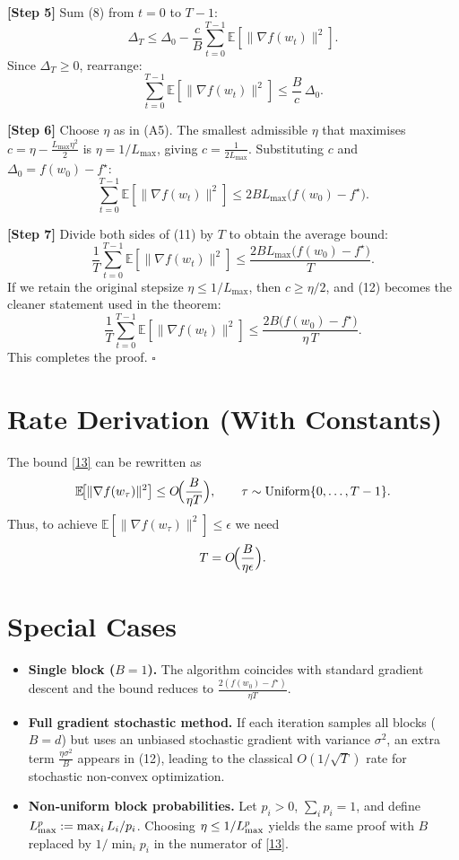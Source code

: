 \documentclass{article}
\newcommand{\E}{\mathbb{E}}
\newcommand{\norm}[1]{\lVert #1\rVert}
\begin{document}
\noindent\textbf{[Step 5]} Sum (8) from $t=0$ to $T-1$:
\[
\Delta_T \le \Delta_0 - \frac{c}{B}\sum_{t=0}^{T-1}
                \E\!\left[\norm{\nabla f(w_t)}^{2}\right].
\tag{9}
\]
Since $\Delta_T\ge0$, rearrange:
\[
\sum_{t=0}^{T-1}\E\!\left[\norm{\nabla f(w_t)}^{2}\right]
   \le \frac{B}{c}\,\Delta_0.
\tag{10}
\]

\noindent\textbf{[Step 6]} Choose $\eta$ as in (A5).  The smallest admissible
$\eta$ that maximises $c=\eta-\frac{L_{\max}\eta^{2}}{2}$ is $\eta=1/L_{\max}$,
giving $c=\frac{1}{2L_{\max}}$.  Substituting $c$ and $\Delta_0=f(w_0)-f^\star$:
\[
\sum_{t=0}^{T-1}\E\!\left[\norm{\nabla f(w_t)}^{2}\right]
   \le 2B L_{\max}\bigl(f(w_0)-f^\star\bigr).
\tag{11}
\]

\noindent\textbf{[Step 7]} Divide both sides of (11) by $T$ to obtain the
average bound:
\[
\frac{1}{T}\sum_{t=0}^{T-1}\E\!\left[\norm{\nabla f(w_t)}^{2}\right]
   \le \frac{2B L_{\max}\bigl(f(w_0)-f^\star\bigr)}{T}.
\tag{12}
\]
If we retain the original stepsize $\eta\le1/L_{\max}$, then $c\ge
\eta/2$, and (12) becomes the cleaner statement used in the theorem:
\[
\frac{1}{T}\sum_{t=0}^{T-1}\E\!\left[\norm{\nabla f(w_t)}^{2}\right]
   \le \frac{2B\bigl(f(w_0)-f^\star\bigr)}{\eta\,T}.
\tag{13}
\]
This completes the proof.  $\square$

\section*{Rate Derivation (With Constants)}
The bound \eqref{13} can be rewritten as
\[
\mathbb{E}\!\big[\|\nabla f(w_{\tau})\|^{2}\big]
   \le O\!\Bigl(\frac{B}{\eta T}\Bigr),
\qquad
\tau\sim\text{Uniform}\{0,\dots ,T-1\}.
\]
Thus, to achieve $\E[\|\nabla f(w_{\tau})\|^{2}]\le\epsilon$ we need
\[
T = O\!\Bigl(\frac{B}{\eta\epsilon}\Bigr).
\]

\section*{Special Cases}
\begin{itemize}
\item \textbf{Single block ($B=1$).} The algorithm coincides with
standard gradient descent and the bound reduces to
$\frac{2(f(w_0)-f^\star)}{\eta T}$.
\item \textbf{Full gradient stochastic method.} If each iteration samples
all blocks ($B=d$) but uses an unbiased stochastic gradient with variance
$\sigma^{2}$, an extra term $\frac{\eta\sigma^{2}}{B}$ appears in (12), leading
to the classical $O(1/\sqrt{T})$ rate for stochastic non‑convex optimization.
\item \textbf{Non‑uniform block probabilities.}
Let $p_i>0$, $\sum_i p_i=1$, and define $L_{\rm max}^{p}:=\max_i L_i/p_i$.
Choosing $\eta\le 1/L_{\rm max}^{p}$ yields the same proof with $B$ replaced
by $1/\min_i p_i$ in the numerator of \eqref{13}.
\end{itemize}
\end{document}
